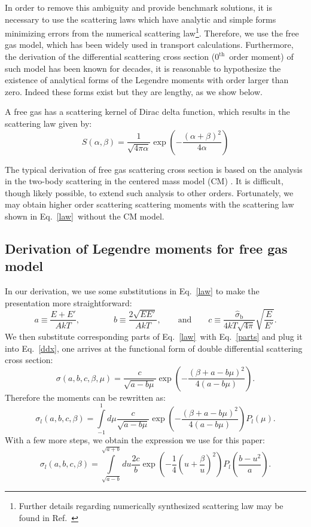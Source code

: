 \documentclass[review]{elsarticle}
\newcommand{\law}{S(\alpha,\beta)}
\begin{document}
In order to remove this ambiguity and provide benchmark solutions, it is necessary to use the scattering laws which have analytic and simple forms minimizing errors from the numerical scattering law\footnote{Further details regarding numerically synthesized scattering law may be found in Ref.~\cite{Macf}}. Therefore, we use the free gas model, which has been widely used in transport calculations. Furthermore, the derivation of the differential scattering cross section ($0^\mathrm{th}$~order moment) of such model has been known for decades, it is reasonable to hypothesize the existence of analytical forms of the Legendre moments with order larger than zero. Indeed these forms exist but they are lengthy, as we show below.

A free gas has a scattering kernel of Dirac delta function, which results in the scattering law given by:
\begin{equation}\label{law}
\law=\frac{1}{\sqrt{4\pi\alpha}}\exp\left(-\frac{(\alpha+\beta)^2}{4\alpha}\right)
\end{equation}

The typical derivation of free gas scattering cross section is based on the analysis in the two-body scattering in the centered mass model (CM) \cite{glasstone}. It is difficult, though likely possible, to extend such analysis to other orders. 
Fortunately, we may obtain higher order scattering scattering moments with the scattering law shown in Eq.~\eqref{law}~without the CM model.
\subsection{Derivation of Legendre moments for free gas model}
In our derivation, we use some substitutions in Eq.~\eqref{law} to make the presentation more straightforward:
\begin{equation}\label{parts}
a\equiv\frac{E+E'}{AkT}\mathrm{,}\qquad\qquad b\equiv\frac{2\sqrt{EE'}}{AkT},\qquad\mathrm{and}\qquad c\equiv\frac{\hat{\sigma}_\mathrm{b}}{4kT\sqrt{4\pi}}\sqrt{\frac{E}{E'}}.
\end{equation}
We then substitute corresponding parts of Eq.~\eqref{law}~with Eq.~\eqref{parts} and plug it into Eq.~\eqref{ddx}, one arrives at the functional form of double differential scattering cross section:
\begin{equation}
\sigma(a,b,c,\beta,\mu)=\frac{c}{\sqrt{a-b\mu}}\exp\left(-\frac{(\beta+a-b\mu)^2}{4(a-b\mu)}\right).
\end{equation}
Therefore the moments can be rewritten as:
\begin{equation}
\sigma_l(a,b,c,\beta)=\int\limits_{-1}^{1}d\mu\frac{c}{\sqrt{a-b\mu}}\exp\left(-\frac{(\beta+a-b\mu)^2}{4(a-b\mu)}\right)P_l(\mu).
\end{equation}
With a few more steps, we obtain the expression we use for this paper:
\begin{equation}
\sigma_l(a,b,c,\beta)=\int\limits_{\sqrt{a-b}}^{\sqrt{a+b}}du\frac{2c}{b}\exp\left(-\frac{1}{4}\left(u+\frac{\beta}{u}\right)^2\right)P_l\left(\frac{b-u^2}{a}\right).
\end{equation}
\end{document}
